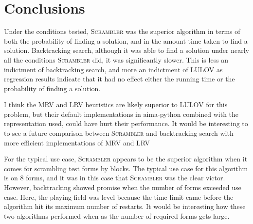 \documentclass[11pt]{article}
\begin{document}
\section{Conclusions}
\par
Under the conditions tested, \textsc{Scrambler} was the superior
algorithm in terms of both the probability of finding a solution, and
in the amount time taken to find a solution.  Backtracking search,
although it was able to find a solution under nearly all the
conditions \textsc{Scrambler} did, it was significantly slower. This
is less an indictment of backtracking search, and more an indictment
of LULOV as regression results indicate that it had no effect either
the running time or the probability of finding a solution.
\par
I think the MRV and LRV heuristics are likely superior to LULOV for
this problem, but their default implementations in aima-python
combined with the representation used, could have hurt their
performance. It would be interesting to to see a future comparison
between \textsc{Scrambler} and backtracking search with more efficient
implementations of MRV and LRV
\par
For the typical use case, \textsc{Scrambler} appears to be the
superior algorithm when it comes for scrambling test forms by blocks.
The typical use case for this algorithm is on 8 forms, and it was in
this case that \textsc{Scrambler} was the clear victor.  However,
backtracking showed promise when the number of forms exceeded use
case.  Here, the playing field was level because the time limit came
before the algorithm hit its maximum number of restarts. It would be
interesting how these two algorithms performed when as the number of
required forms gets large.

\printbibliography
\end{document}
